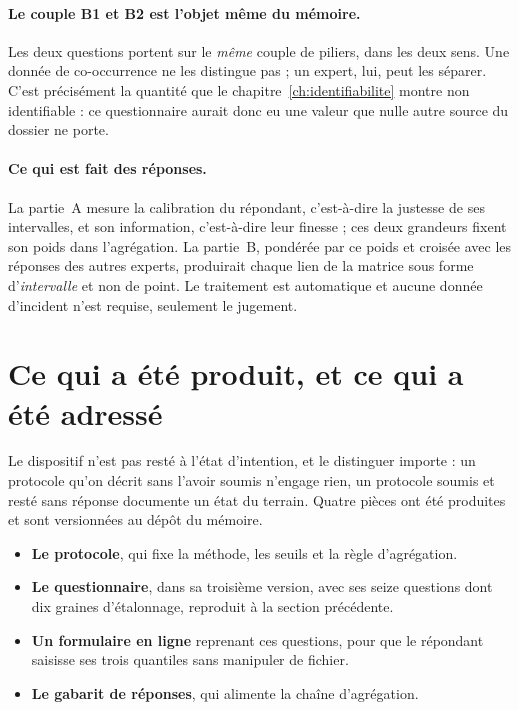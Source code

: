 \paragraph{Le couple B1 et B2 est l'objet même du mémoire.} Les deux questions portent sur le
\emph{même} couple de piliers, dans les deux sens. Une donnée de co-occurrence ne les distingue
pas ; un expert, lui, peut les séparer. C'est précisément la quantité que le
chapitre~\ref{ch:identifiabilite} montre non identifiable : ce
questionnaire aurait donc eu une valeur que nulle autre source du dossier ne porte.

\paragraph{Ce qui est fait des réponses.} La partie~A mesure la calibration du répondant, c'est-à-dire
la justesse de ses intervalles, et son information, c'est-à-dire leur finesse ; ces deux
grandeurs fixent son poids dans l'agrégation. La partie~B, pondérée par ce poids et croisée avec
les réponses des autres experts, produirait chaque lien de la matrice sous forme d'\emph{intervalle}
et non de point. Le traitement est automatique et aucune donnée d'incident n'est requise, seulement
le jugement.

\section{Ce qui a été produit, et ce qui a été adressé}


Le dispositif n'est pas resté à l'état d'intention, et le distinguer importe : un protocole qu'on
décrit sans l'avoir soumis n'engage rien, un protocole soumis et resté sans réponse documente un
état du terrain. Quatre pièces ont été produites et sont versionnées au dépôt du mémoire.

\begin{itemize}[itemsep=2pt,topsep=3pt]
\item \textbf{Le protocole}, qui fixe la méthode, les seuils et la règle d'agrégation.
\item \textbf{Le questionnaire}, dans sa troisième version, avec ses seize questions dont dix
      graines d'étalonnage, reproduit à la section précédente.
\item \textbf{Un formulaire en ligne} reprenant ces questions, pour que le répondant saisisse
      ses trois quantiles sans manipuler de fichier.
\item \textbf{Le gabarit de réponses}, qui alimente la chaîne d'agrégation.
\end{itemize}

